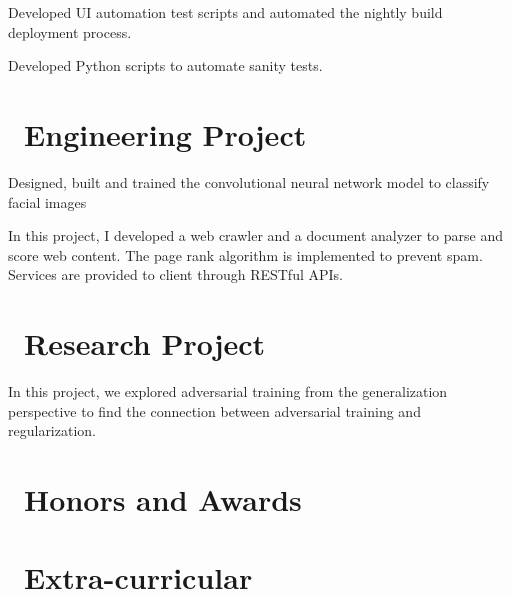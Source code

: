 \documentclass{resume}
\begin{document}
Developed UI automation test scripts and automated the nightly build deployment process.


Developed Python scripts to automate sanity tests.

\section{\faUsers\ Engineering Project}
Designed, built and trained the convolutional neural network model to classify facial images

In this project, I developed a web crawler and a document analyzer to parse and score web content. The page rank algorithm is implemented to prevent spam. Services are provided to client through RESTful APIs.

\section{\faUsers\ Research Project}
In this project, we explored adversarial training from the generalization perspective to find the connection between adversarial training and regularization.

\section{\faHeartO\ Honors and Awards}

\section{\faInfo\ Extra-curricular}

%
%
\end{document}
